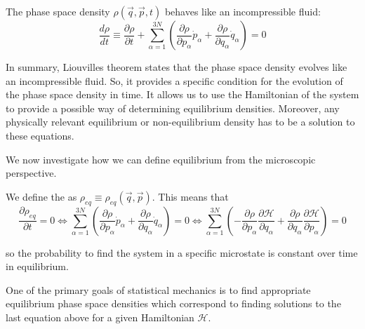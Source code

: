 \documentclass[12pt, a4paper, oneside, openright, titlepage]{book}
\begin{document}
\begin{namthm}
    The phase space density $\rho(\vec{q},\vec{p},t)$ behaves like an incompressible fluid: \begin{equation*}
        \frac{d\rho}{dt} \equiv \frac{\partial \rho}{\partial t} + \sum_{\alpha=1}^{3N}\left(\frac{\partial \rho}{\partial p_{\alpha}}\dot{p}_{\alpha} + \frac{\partial \rho}{\partial q_{\alpha}}\dot{q}_{\alpha}\right) = 0
    \end{equation*}
\end{namthm}

\begin{rmk}
    In summary, Liouvilles theorem states that the phase space density evolves like an incompressible fluid. So, it provides a specific condition for the evolution of the phase space density in time. It allows us to use the Hamiltonian of the system to provide a possible way of determining equilibrium densities. Moreover, any physically relevant equilibrium or non-equilibrium density has to be a solution to these equations.
\end{rmk}

We now investigate how we can define equilibrium from the microscopic perspective.

\begin{defn}
    We define the  as $\rho_{eq} \equiv \rho_{eq}(\vec{q},\vec{p})$. This means that \begin{equation*}
        \frac{\partial \rho_{eq}}{\partial t} = 0 \iff \sum_{\alpha=1}^{3N}\left(\frac{\partial \rho}{\partial p_{\alpha}}\dot{p}_{\alpha} + \frac{\partial \rho}{\partial q_{\alpha}}\dot{q}_{\alpha}\right) = 0 \iff \sum_{\alpha=1}^{3N}\left(-\frac{\partial \rho}{\partial p_{\alpha}}\frac{\partial \mathcal{H}}{\partial q_{\alpha}} + \frac{\partial \rho}{\partial q_{\alpha}}\frac{\partial \mathcal{H}}{\partial p_{\alpha}}\right) = 0
    \end{equation*}
\end{defn}

so the probability to find the system in a specific microstate is constant over time in equilibrium. 

\begin{note}
    One of the primary goals of statistical mechanics is to find appropriate equilibrium phase space densities which correspond to finding solutions to the last equation above for a given Hamiltonian $\mathcal{H}$.
\end{note}
\end{document}
